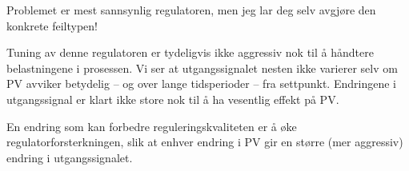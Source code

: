 Problemet er mest sannsynlig regulatoren, men jeg lar deg selv avgjøre den konkrete feiltypen!







Tuning av denne regulatoren er tydeligvis ikke aggressiv nok til å håndtere belastningene i prosessen. Vi ser at utgangssignalet nesten ikke varierer selv om PV avviker betydelig -- og over lange tidsperioder -- fra settpunkt. Endringene i utgangssignal er klart ikke store nok til å ha vesentlig effekt på PV.

\vskip 10pt

En endring som kan forbedre reguleringskvaliteten er å øke regulatorforsterkningen, slik at enhver endring i PV gir en større (mer aggressiv) endring i utgangssignalet.



